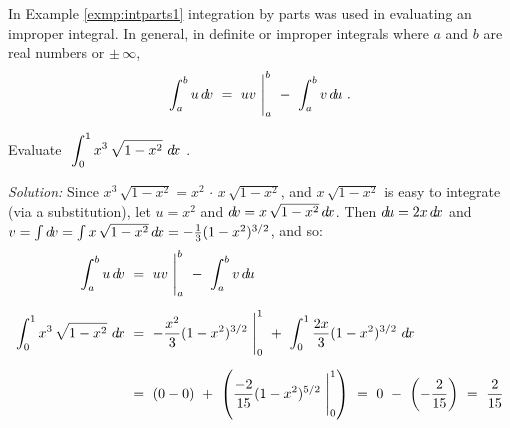 \divider
\newpage
In Example \ref{exmp:intparts1} integration by parts was used in evaluating an
improper integral. In general, in definite or improper integrals where $a$ and
$b$ are real numbers or $\pm\,\infty$,
\[
\int_a^b u\,d\!v ~=~ uv~\Biggr|_a^b ~-~ \int_a^b v\,d\!u ~.
\]
\begin{exmp}\label{exmp:intparts9}
\noindent Evaluate $~\displaystyle\int_0^1 x^3\,\sqrt{1-x^2}~d\!x~$.\vspace{1mm}
\par\noindent\emph{Solution:} Since
$x^3\,\sqrt{1-x^2} =x^2\,\cdot\,x\,\sqrt{1-x^2}$, and $x\,\sqrt{1-x^2}$
is easy to integrate (via a substitution), let  $u=x^2$ and
$d\!v=x\,\sqrt{1-x^2}\,d\!x$. Then $d\!u = 2x\,d\!x$ and
$v = \int d\!v = \int x\,\sqrt{1-x^2}\,d\!x = -\frac{1}{3}(1-x^2)^{3/2}$, and so:
\begin{align*}
\int_a^b u\,d\!v ~&=~ uv~\Biggr|_a^b ~-~ \int_a^b v\,d\!u\\[6pt]
\int_0^1 x^3\,\sqrt{1-x^2}~d\!x ~&=~ -\frac{x^2}{3}(1-x^2)^{3/2}~\Biggr|_0^1 ~+~
 \int_0^1 \frac{2x}{3}(1-x^2)^{3/2}~d\!x\\[6pt]
&=~ (0 - 0) ~+~ \left(\frac{-2}{15}(1-x^2)^{5/2}~\Biggr|_0^1\right) ~=~ 0 ~-~
 \left(-\frac{2}{15}\right) ~=~ \frac{2}{15}
\end{align*}
\end{exmp}
\divider
\vspace{3mm}
\startexercises\label{sec6dot1}
